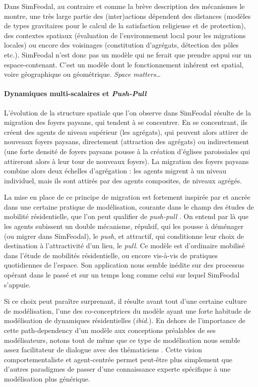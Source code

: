Dans SimFeodal, au contraire et comme la brève description des mécanismes le montre, une très large partie des (inter)actions dépendent des distances (modèles de types gravitaires pour le calcul de la satisfaction religieuse et de protection), des contextes spatiaux (évaluation de l'environnement local pour les migrations locales) ou encore des voisinages (constitution d'agrégats, détection des pôles etc.).
SimFeodal n'est donc pas un modèle qui ne ferait que prendre appui sur un espace-contenant.
C'est un modèle dont le fonctionnement inhérent est spatial, voire géographique ou géométrique.
\textit{Space matters}\ldots

\paragraph{Dynamiques multi-scalaires et \textit{Push-Pull}}

L'évolution de la structure spatiale que l'on observe dans SimFeodal résulte de la migration des foyers paysans, qui tendent à se concentrer.
En se concentrant, ils créent des agents de niveau supérieur (les agrégats), qui peuvent alors attirer de nouveaux foyers paysans, directement (attraction des agrégats) ou indirectement (une forte densité de foyers paysans pousse à la création d'églises paroissiales qui attireront alors à leur tour de nouveaux foyers).
La migration des foyers paysans combine alors deux échelles d'agrégation :
	les agents migrent à un niveau individuel, mais ils sont attirés par des agents composites, de niveaux agrégés.

La mise en place de ce principe de migration est fortement inspirée par et ancrée dans une certaine pratique de modélisation, courante dans le champ des études de mobilité résidentielle, que l'on peut qualifier de \og \textit{push-pull}\fg{} \autocite{tannier_analyse_2017}.
On entend par là que les agents subissent un double mécanisme, répulsif, qui les pousse à déménager (ou migrer dans SimFeodal), le \textit{push}, et attractif, qui conditionne leur choix de destination à l'attractivité d'un lieu, le \textit{pull}.
Ce modèle est d'ordinaire mobilisé dans l'étude de mobilités résidentielle, ou encore vis-à-vis de pratiques quotidiennes de l'espace.
Son application nous semble inédite sur des processus opérant dans le passé et sur un temps long comme celui sur lequel SimFeodal s'appuie.

Si ce choix peut paraître surprenant, il résulte avant tout d'une certaine \og culture de modélisation\fg{}, l'une des co-conceptrices du modèle ayant une forte habitude de modélisation de dynamiques résidentielles (\textit{ibid.}).
En dehors de l'importance de cette \og path-dependency\fg{} d'un modèle aux conceptions préalables de ses modélisateurs, notons tout de même que ce type de modélisation nous semble assez facilitateur de dialogue avec des thématiciens .
Cette vision \og comportementaliste\fg{} et agent-centrée permet peut-être plus simplement que d'autres paradigmes de passer d'une connaissance experte spécifique à une modélisation plus générique.


